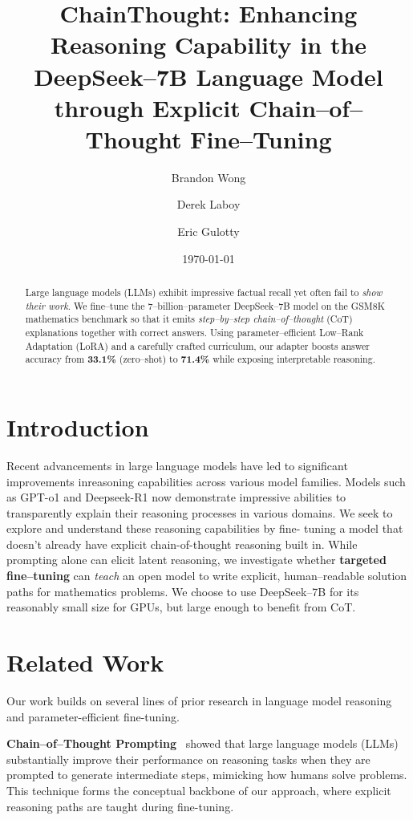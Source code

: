 \documentclass[11pt]{article}
\title{\textbf{ChainThought: Enhancing Reasoning Capability in the DeepSeek--7B Language Model through Explicit Chain--of--Thought Fine--Tuning}}
\author{Brandon Wong \and Derek Laboy \and Eric Gulotty}
\date{\today}
\begin{document}
\maketitle

\begin{abstract}
Large language models (LLMs) exhibit impressive factual recall yet often fail to \emph{show their work}. We fine--tune the 7--billion--parameter DeepSeek--7B model on the GSM8K mathematics benchmark so that it emits \textit{step--by--step chain--of--thought} (CoT) explanations together with correct answers. Using parameter--efficient Low--Rank Adaptation (LoRA) and a carefully crafted curriculum, our adapter boosts answer accuracy from \textbf{33.1\%} (zero--shot) to \textbf{71.4\%} while exposing interpretable reasoning.\end{abstract}

\section{Introduction}
Recent advancements in large language models have led to significant improvements inreasoning capabilities across various model families. Models such as GPT-o1 and Deepseek-R1 now demonstrate impressive abilities to transparently explain their reasoning processes in various domains.  We seek to explore and understand these reasoning capabilities by fine-
tuning a model that doesn't already have explicit chain-of-thought reasoning built in. While prompting alone can elicit latent reasoning, we investigate whether \textbf{targeted fine--tuning} can \emph{teach} an open model to write explicit, human--readable solution paths for mathematics problems. We choose to use DeepSeek--7B for its reasonably small size for GPUs, but large enough to benefit from CoT.

\section{Related Work}

Our work builds on several lines of prior research in language model reasoning and parameter-efficient fine-tuning.

\textbf{Chain--of--Thought Prompting}~\cite{wei2022cot} showed that large language models (LLMs) substantially improve their performance on reasoning tasks when they are prompted to generate intermediate steps, mimicking how humans solve problems. This technique forms the conceptual backbone of our approach, where explicit reasoning paths are taught during fine-tuning.
\end{document}
